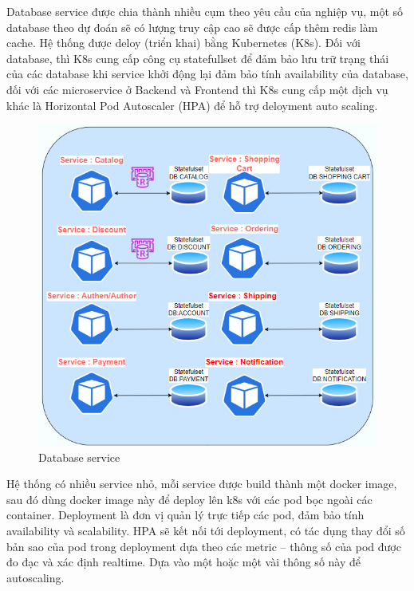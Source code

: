 \noindent Database service được chia thành nhiều cụm theo yêu cầu của nghiệp vụ, một số database theo dự đoán sẽ có lượng truy cập cao sẽ được cấp thêm redis làm cache. Hệ thống được deloy (triển khai) bằng Kubernetes (K8s). Đối với database, thì K8s cung cấp công cụ statefullset để đảm bảo lưu trữ trạng thái của các database khi service khởi động lại đảm bảo tính availability của database, đối với các microservice ở Backend và Frontend thì K8s cung cấp một dịch vụ khác là Horizontal Pod Autoscaler (HPA) để hỗ trợ deloyment auto scaling.
 \begin{figure}[H]
    \begin{center}
    \includegraphics[scale = 0.7]{images/phat/DB_service.jpg}
    \vspace*{7mm}
    \caption{Database service}
    \end{center}
    \label{}
\end{figure}
\noindent Hệ thống có nhiều service nhỏ, mỗi service được build thành một docker image, sau đó dùng docker image này để deploy lên k8s với các pod bọc ngoài các container. Deployment là đơn vị quản lý trực tiếp các pod, đảm bảo tính availability và scalability. HPA sẽ kết nối tới deployment, có tác dụng thay đổi số bản sao của pod trong deployment dựa theo các metric – thông số của pod được đo đạc và xác định realtime. Dựa vào một hoặc một vài thông số này để autoscaling.
